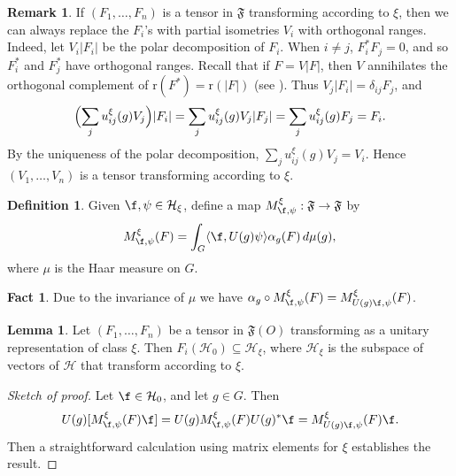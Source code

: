 \documentclass[11pt]{article}
\theoremstyle{definition}
\newtheorem{fact}[thm]{Fact}
\newtheorem{lemma}[thm]{Lemma}
\theoremstyle{definition}
\newtheorem{defn}[thm]{Definition}
\newtheorem{note}[thm]{Remark}
\theoremstyle{remark}
\def\2#1{{\mathcal #1}}
\def\al#1{{\mathfrak #1}}
\def\a{\alpha} \def\b{\beta} \def\g{\gamma} \def\d{\delta}
\begin{document}
\begin{note} If $(F_1,\dots ,F_n)$ is a tensor in $\al F$ transforming
  according to $\xi$, then we can always replace the $F_i$'s with
  partial isometries $V_i$ with orthogonal ranges.  Indeed, let
  $V_i|F_i|$ be the polar decomposition of $F_i$.  When $i\neq j$,
  $F_i^*F_j=0$, and so $F^{*}_i$ and $F^*_j$ have orthogonal ranges.
  Recall that if $F=V|F|$, then $V$ annihilates the orthogonal
  complement of $\mathrm{r}(F^*)=\mathrm{r}(|F|)$ (see \cite[Thm.\
  6.1.2]{kr}).  Thus $V_j|F_i|=\d _{ij}F_j$, and $$ \Bigl( \sum
  _ju^{\xi}_{ij}(g)V_j \Bigr) |F_i| = \sum
  _{j}u^{\xi}_{ij}(g)V_{j}|F_j| = \sum _ju^{\xi}_{ij}(g)F_j =
  F_i .$$ By the uniqueness of the polar decomposition, $\sum
  _{j}u^{\xi}_{ij}(g)V_{j}=V_i$.  Hence $(V_1,\dots ,V_n)$ is a
  tensor transforming according to $\xi$.
\end{note}

\begin{defn} Given $\f ,\psi \in \2H _{\xi}$, define a map
  $M^{\xi}_{\f ,\psi}:\al F\to \al F$ by
$$ M^{\xi}_{\f,\psi }(F) =\int _G\langle \f ,U(g)\psi \rangle \a _g(F)
\,d\mu (g) ,$$ where $\mu$ is the Haar measure on $G$.
\end{defn}

\begin{fact} Due to the invariance of $\mu$ we have
  $\a _g \circ M^{\xi}_{\f ,\psi}(F)=M^{\xi}_{U(g)\f ,\psi
  }(F)$.  \end{fact}


\begin{lemma} Let $(F_1,\dots ,F_n)$ be a tensor in $\al F (O)$
  transforming as a unitary representation of class $\xi$.  Then
  $F_i(\2H _0)\subseteq \2H _{\xi}$, where $\2H _{\xi}$ is the
  subspace of vectors of $\2H$ that transform according to $\xi$.
  \label{crash}
\end{lemma}

\begin{proof}[Sketch of proof] Let $\f \in \2H _0$, and let $g\in G$.
  Then
  \begin{eqnarray*} U(g)[M^{\xi}_{\f ,\psi}(F)\f] = U(g)M^{\xi}_{\f
      ,\psi}(F)U(g)^*\f = M^{\xi}_{U(g)\f ,\psi}(F)\f
    . \end{eqnarray*} Then a straightforward calculation using matrix
  elements for $\xi$ establishes the result.
\end{proof}
\end{document}
